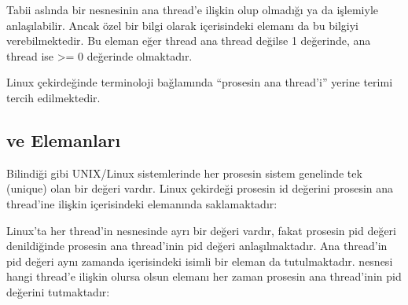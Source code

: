 \documentclass[a4paper,10pt,turkish]{sphinxmanual}
\begin{document}
\sphinxAtStartPar
Tabii aslında bir  nesnesinin ana thread’e ilişkin olup olmadığı 
ya da  işlemiyle anlaşılabilir. Ancak özel bir bilgi olarak 
içerisindeki  elemanı da bu bilgiyi verebilmektedir. Bu eleman eğer thread ana thread
değilse \sphinxhyphen{}1 değerinde, ana thread ise \textgreater{}= 0 değerinde olmaktadır.

\sphinxAtStartPar
Linux çekirdeğinde terminoloji bağlamında “prosesin ana thread’i” yerine  terimi tercih edilmektedir.


\subsection{ ve  Elemanları}
\label{\detokenize{processcontrolblock:pid-ve-tgid-elemanlari}}
\sphinxAtStartPar
Bilindiği gibi UNIX/Linux sistemlerinde her prosesin sistem genelinde tek (unique) olan bir  değeri vardır. Linux çekirdeği prosesin id değerini prosesin ana thread’ine ilişkin 
içerisindeki  elemanında saklamaktadır:

\begin{sphinxVerbatim}[commandchars=\\\{\}]
\end{sphinxVerbatim}

\sphinxAtStartPar
Linux’ta her thread’in  nesnesinde ayrı bir  değeri vardır, fakat prosesin pid
değeri denildiğinde prosesin ana thread’inin pid değeri anlaşılmaktadır. Ana thread’in pid değeri aynı
zamanda  içerisindeki  isimli bir eleman da tutulmaktadır.  nesnesi
hangi thread’e ilişkin olursa olsun  elemanı her zaman prosesin ana thread’inin pid değerini
tutmaktadır:
\end{document}
